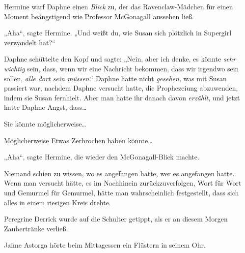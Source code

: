 Hermine warf Daphne einen \emph{Blick} zu, der das Ravenclaw-Mädchen für einen Moment beängstigend wie Professor McGonagall aussehen ließ.

„Aha“, sagte Hermine. „Und weißt du, wie Susan sich plötzlich in Supergirl verwandelt hat?“

Daphne schüttelte den Kopf und sagte: „Nein, aber ich denke, es könnte \emph{sehr wichtig} sein, dass, wenn wir eine Nachricht bekommen, dass wir irgendwo sein sollen, \emph{alle dort sein müssen}.“ Daphne hatte nicht \emph{gesehen}, was mit Susan passiert war, nachdem Daphne versucht hatte, die Prophezeiung abzuwenden, indem sie Susan fernhielt. Aber man hatte ihr danach davon \emph{erzählt}, und jetzt hatte Daphne Angst, dass…

Sie könnte möglicherweise…

Möglicherweise Etwas Zerbrochen haben könnte…

„Aha“, sagte Hermine, die wieder den McGonagall-Blick machte.

\later

Niemand schien zu wissen, wo es angefangen hatte, wer es angefangen hatte. Wenn man versucht hätte, es im Nachhinein zurückzuverfolgen, Wort für Wort und Gemurmel für Gemurmel, hätte man wahrscheinlich festgestellt, dass sich alles in einem riesigen Kreis drehte.

Peregrine Derrick wurde auf die Schulter getippt, als er an diesem Morgen Zaubertränke verließ.

Jaime Astorga hörte beim Mittagessen ein Flüstern in seinem Ohr.

